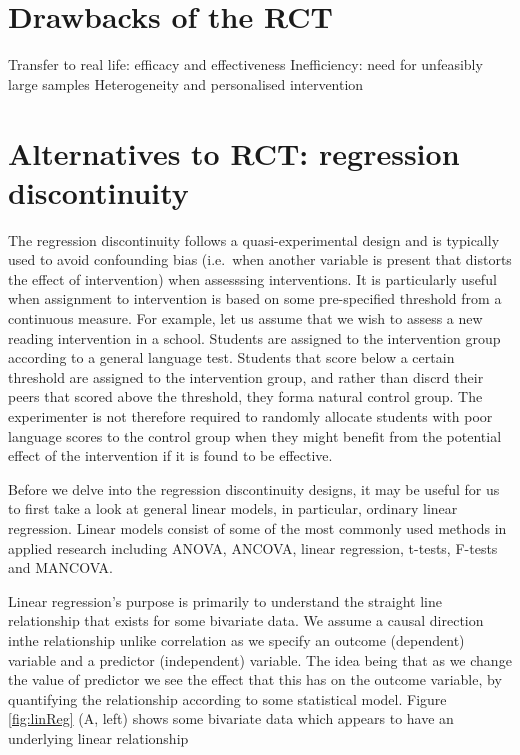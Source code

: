 \documentclass[]{book}
\begin{document}
\hypertarget{drawbacks-of-the-rct}{%
\chapter{Drawbacks of the RCT}\label{drawbacks-of-the-rct}}

Transfer to real life: efficacy and effectiveness
Inefficiency: need for unfeasibly large samples
Heterogeneity and personalised intervention

\hypertarget{alternatives-to-rct-regression-discontinuity}{%
\chapter{Alternatives to RCT: regression discontinuity}\label{alternatives-to-rct-regression-discontinuity}}

The regression discontinuity follows a quasi-experimental design and is typically used to avoid confounding bias (i.e.~when another variable is present that distorts the effect of intervention) when assesssing interventions. It is particularly useful when assignment to intervention is based on some pre-specified threshold from a continuous measure. For example, let us assume that we wish to assess a new reading intervention in a school. Students are assigned to the intervention group according to a general language test. Students that score below a certain threshold are assigned to the intervention group, and rather than discrd their peers that scored above the threshold, they forma natural control group. The experimenter is not therefore required to randomly allocate students with poor language scores to the control group when they might benefit from the potential effect of the intervention if it is found to be effective.

Before we delve into the regression discontinuity designs, it may be useful for us to first take a look at general linear models, in particular, ordinary linear regression. Linear models consist of some of the most commonly used methods in applied research including ANOVA, ANCOVA, linear regression, t-tests, F-tests and MANCOVA.

Linear regression's purpose is primarily to understand the straight line relationship that exists for some bivariate data. We assume a causal direction inthe relationship unlike correlation as we specify an outcome (dependent) variable and a predictor (independent) variable. The idea being that as we change the value of predictor we see the effect that this has on the outcome variable, by quantifying the relationship according to some statistical model. Figure \ref{fig:linReg} (A, left) shows some bivariate data which appears to have an underlying linear relationship
\end{document}
